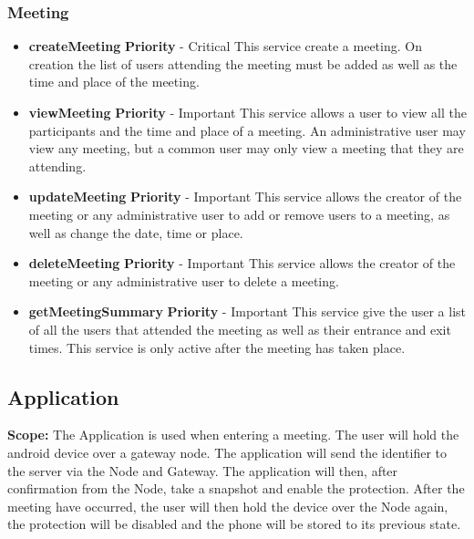 \documentclass[a4paper,12pt,titlepage]{article}
\begin{document}
		\subsubsection{Meeting}
		\begin{itemize}
			\item \textbf{createMeeting}
				\newline\textbf{ Priority } - Critical
				\newline This service create a meeting. On creation the list of users attending the meeting must be added as well as the time and place of the meeting.
			\item \textbf{viewMeeting}
				\newline\textbf{ Priority } - Important
				\newline This service allows a user to view all the participants and the time and place of a meeting. An administrative user may view any meeting, but a common user may only view a meeting that they are attending.
			\item \textbf{updateMeeting}
				\newline\textbf{ Priority } - Important
				\newline This service allows the creator of the meeting or any administrative user to add or remove users to a meeting, as well as change the date, time or place.
			\item \textbf{deleteMeeting}
				\newline\textbf{ Priority } - Important
				\newline This service allows the creator of the meeting or any administrative user to delete a meeting.
			\item \textbf{getMeetingSummary}
				\newline\textbf{ Priority } - Important
				\newline This service give the user a list of all the users that attended the meeting as well as their entrance and exit times. This service is only active after the meeting has taken place.

		\end{itemize}

\newpage
		\subsection{Application}
			\textbf{Scope: }The Application is used when entering a meeting. The user will hold the android device over a gateway node. The application will send the identifier to the server via the Node and Gateway. The application will then, after confirmation from the Node, take a snapshot and enable the protection. After the meeting have occurred, the user will then hold the device over the Node again, the protection will be disabled and the phone will be stored to its previous state. 
		
\end{document}
